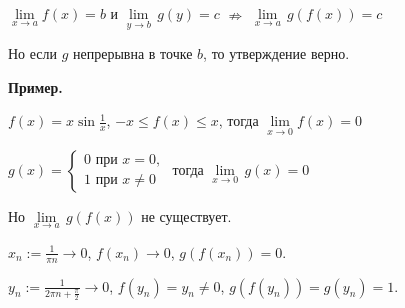 $\underset{x \rightarrow a}{\lim} f(x) = b$ и
$\underset{y \rightarrow b}{\lim} \, g(y) = c$ $\nRightarrow$ 
$\underset{x \rightarrow a}{\lim} \, g(f(x)) = c$

\notice Но если $g$ непрерывна в точке $b$, то утверждение верно.

\textbf{Пример.}

$f(x) = x \sin \frac 1 x$, $-x \leqslant f(x) \leqslant x$, тогда
$\underset{x \rightarrow 0}{\lim} f(x) = 0$

$g(x) = \begin{cases}
    0 \text{ при } x = 0, \\
    1 \text{ при } x \neq 0
\end{cases}$ тогда $\underset{x \rightarrow 0}{\lim} \, g(x) = 0$

Но $\underset{x \rightarrow a}{\lim} \, g(f(x))$ не существует.

$x_n := \frac {1}{\pi n} \rightarrow 0$, $f(x_n) \rightarrow 0$,
$g(f(x_n)) = 0$.

$y_n := \frac{1}{2 \pi n + \frac{\pi}{2}} \rightarrow 0$,
$f(y_n) = y_n \neq 0$, $g(f(y_n)) = g(y_n) = 1$.

